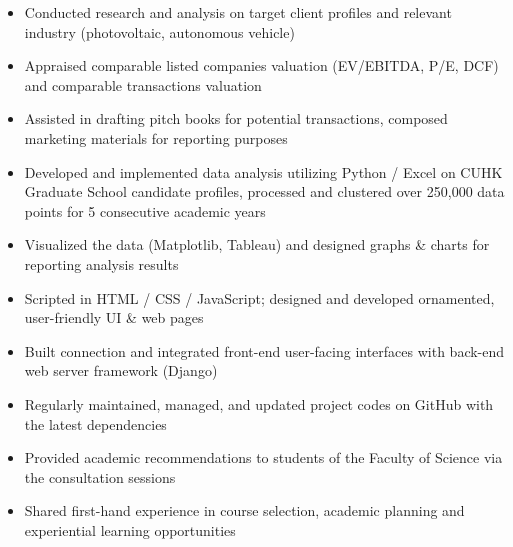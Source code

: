 \documentclass[classic]{resume}
\begin{document}
    \begin{itemize}
        \item Conducted research and analysis on target client profiles and relevant industry (photovoltaic, autonomous vehicle)
        \item Appraised comparable listed companies valuation (EV/EBITDA, P/E, DCF) and comparable transactions valuation
        \item Assisted in drafting pitch books for potential transactions, composed marketing materials for reporting purposes
    \end{itemize}
    \begin{itemize}
        \item Developed and implemented data analysis utilizing  Python / Excel on CUHK Graduate School candidate profiles, processed and clustered over 250,000 data points for 5 consecutive academic years
        \item Visualized the data (Matplotlib, Tableau) and designed graphs \& charts for reporting analysis results
    \end{itemize}
    \begin{itemize}
        \item Scripted in HTML / CSS / JavaScript; designed and developed ornamented, user-friendly UI \& web pages
        \item Built connection and integrated front-end user-facing interfaces with back-end web server framework (Django)
        \item Regularly maintained, managed, and updated project codes on GitHub with the latest dependencies
    \end{itemize}
    \begin{itemize}
        \item Provided academic recommendations to students of the Faculty of Science via the consultation sessions
        \item Shared first-hand experience in course selection, academic planning and experiential learning opportunities
    \end{itemize}
    
\end{document}
